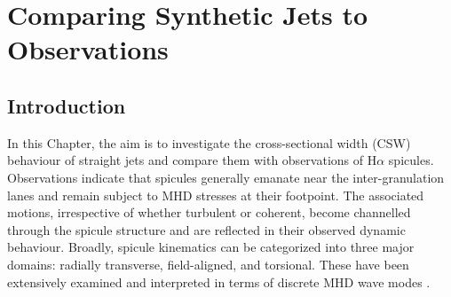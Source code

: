 \chapter{Comparing Synthetic Jets to Observations}
\label{cap:obs}
\let\thefootnote\relax{}
\section{Introduction}
In this Chapter, the aim is to investigate the cross-sectional width (CSW) behaviour of straight jets and compare them with observations of H$\alpha$ spicules. Observations indicate that spicules generally emanate near the inter-granulation lanes and remain subject to MHD stresses at their footpoint. The associated motions, irrespective of whether turbulent or coherent, become channelled through the spicule structure and are reflected in their observed dynamic behaviour. Broadly, spicule kinematics can be categorized into three major domains: radially transverse, field-aligned, and torsional. These have been extensively examined and interpreted in terms of discrete MHD wave modes \citep[see review:][]{Zaqarashvili_2009SSRv}. \np  
%
